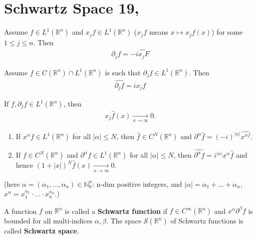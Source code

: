 \section{Schwartz Space \tiny{19, \cite{schilling2017measures}}}
\begin{proposition}
    Assume \(f\in L^1(\mathbb{R}^n)\) and \(x_j f\in L^{1}(\mathbb{R}^n)\) (\(x_j f\) means \(x\mapsto x_j f(x)\)) for some \(1\leq j\leq n\). Then 
    \begin{align*}
        \partial_j \hat{f} = -i\widehat{x_j F}
    \end{align*}
\end{proposition}
\begin{proposition}
    Assume \(f\in C(\mathbb{R}^n)\cap L^{1}(\mathbb{R}^n)\) is such that \(\partial_j f\in L^{1}(\mathbb{R}^n)\). Then 
    \begin{align*}
        \widehat{\partial_j f} = i x_j f
    \end{align*}
\end{proposition}
\begin{corollary}
    If \(f,\partial_j f\in L^{1}(\mathbb{R}^n)\), then 
    \begin{align*}
        x_j \hat{f}(x) \xrightarrow[x\rightarrow\infty]{ } 0.
    \end{align*}
\end{corollary}
\begin{corollary}
    \begin{enumerate}
        \item If \(x^{\alpha}f\in L^{1}(\mathbb{R}^n)\) for all \(|\alpha|\leq N\), then \(\hat{f}\in C^N(\mathbb{R}^n)\) and \(\partial^{\alpha}\hat{f} = (-i)^{|\alpha|} \widehat{x^{\alpha f}}\).
        \item If \(f\in C^N(\mathbb{R}^n)\) and \(\partial^{\alpha}f\in L^1(\mathbb{R}^n)\) for all \(|\alpha|\leq N\), then \(\widehat{\partial^{\alpha} f} = i^{|\alpha|}x^{\alpha}\hat{f}\) and hence \((1 + |x|)^N \hat{f}(x)\xrightarrow[x\rightarrow\infty]{ } 0.\)
    \end{enumerate}
    (here \(\alpha = (\alpha_1, ..., \alpha_n)\in \mathbb{N}_{0}^{n}\): n-dim positive integers, and \(|\alpha|= \alpha_1 + ...+ \alpha_n\), \(x^{\alpha} = x_{1}^{\alpha_1}\cdot ...\cdot x_{n}^{\alpha_n}\).)
\end{corollary}
\begin{definition}
    A function \(f\) on \(\mathbb{R}^n\) is called a \textbf{Schwartz function} if \(f\in C^{\infty}(\mathbb{R}^n)\) and \(x^{\alpha}\partial^{\beta}f\) is bounded for all multi-indices \(\alpha,\beta\). The space \(\mathcal{S}(\mathbb{R}^n)\) of Schwartz functions is called \textbf{Schwartz space}. 
\end{definition}

